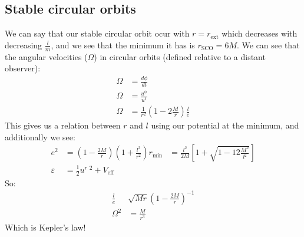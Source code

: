 \subsection{Stable circular orbits}
We can say that our stable circular orbit ocur with $r=r_\text{ext}$ which decreases with decreasing $\frac{l}{m}$, and we see that the minimum it has is $r_\text{SCO} = 6M$.
We can see that the angular velocities ($\Omega$) in circular orbits (defined relative to a distant observer):
\begin{align*}
	\Omega &= \frac{d\phi}{dt} \\
	\Omega &= \frac{u^\phi}{u^t} \\
	\Omega &= \frac{1}{r^2} \left(1 - 2\frac{M}{r}\right) \frac{l}{e}
\end{align*}
This gives us a relation between $r$ and $l$ using our potential at the minimum, and additionally we see:
\begin{align*}
	e^2 &= \left(1-\frac{2M}{r}\right)\left(1 + \frac{l^2}{r^2}\right)
	r_\text{min} &= \frac{l^2}{2M} \left[ 1 + \sqrt{1 - 12\frac{M^2}{l^2}}\right] \\
	\varepsilon &= \frac{1}{2} u^r\ ^2 + V_\text{eff}
\end{align*}
So:
\begin{align*}
	\frac{l}{e} & \sqrt{Mr} \left(1 - \frac{2M}{r}\right)^{-1} \\
	\Omega^2 &= \frac{M}{r^3}
\end{align*}
Which is Kepler's law!

